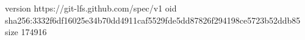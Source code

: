 version https://git-lfs.github.com/spec/v1
oid sha256:3332f6df16025e34b70dd4911caf5529fde5dd87826f294198ce5723b52ddb85
size 174916
